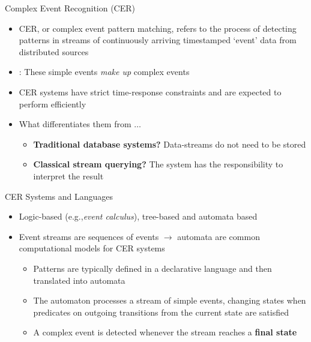 \documentclass[10pt, aspectratio=169]{beamer}
\begin{document}
\begin{frame}{Complex Event Recognition (CER)}
    \begin{itemize}
        \setlength{\itemsep}{12pt}
        \item CER, or complex event pattern matching, refers to the process of detecting patterns in streams of continuously arriving timestamped `event' data from distributed sources
        \item {}: These \textcolor{umBlueLighter}{simple events} \textit{make up} \textcolor{umBlueLighter}{complex events}
        \item CER systems have strict time-response constraints and are expected to perform efficiently 
        \item What differentiates them from $\dots$
        \vspace{0.6em}
        \begin{itemize}
            \setlength{\itemsep}{4pt}
            \item \textbf{Traditional database systems? } Data-streams do not need to be stored
            \item \textbf{Classical stream querying?} The system has  the responsibility to interpret the result
        \end{itemize}
    \end{itemize}
\end{frame}

\begin{frame}{CER Systems and Languages}
    \begin{itemize}
        \setlength{\itemsep}{12pt}
        \item Logic-based (e.g.,\textit{event calculus}), tree-based and \textcolor{umBlueLighter}{automata based}
        \item Event streams are sequences of events $\rightarrow$ automata are common computational models for CER systems
            \vspace{0.6em}
            \begin{itemize}
            \setlength{\itemsep}{4pt}
                \item Patterns are typically defined in a declarative language and then translated into automata
                \item The automaton processes a stream of simple events, changing states when predicates on outgoing transitions from the current state are satisfied
                \item A complex event is detected whenever the stream reaches a \textbf{final state}
            \end{itemize}
    \end{itemize}
\end{frame}
\end{document}

